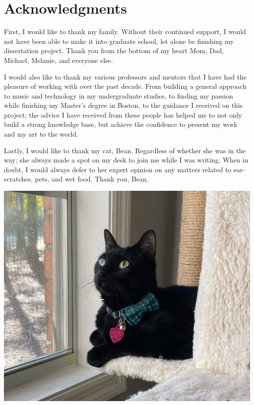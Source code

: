 

\chapter{Acknowledgments}

First, I would like to thank my family. Without their continued support, I would not have been able to make it into graduate school, let alone be finishing my dissertation project. Thank you from the bottom of my heart Mom, Dad, Michael, Melanie, and everyone else. 

I would also like to thank my various professors and mentors that I have had the pleasure of working with over the past decade. From building a general approach to music and technology in my undergraduate studies, to finding my passion while finishing my Master’s degree in Boston, to the guidance I received on this project; the advice I have received from these people has helped me to not only build a strong knowledge base, but achieve the confidence to present my work and my art to the world.

Lastly, I would like to thank my cat, Bean. Regardless of whether she was in the way; she always made a spot on my desk to join me while I was writing. When in doubt, I would always defer to her expert opinion on any matters related to ear-scratches, pets, and wet food. Thank you, Bean.

\vspace{10mm}

\begin{center}
    \includegraphics[scale=0.12]{bean.jpeg}
\end{center}




